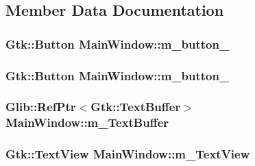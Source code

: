 \subsection{Member Data Documentation}
\subsubsection[{\texorpdfstring{m\+\_\+button\+\_\+1}{m_button_1}}]{\setlength{\rightskip}{0pt plus 5cm}Gtk\+::\+Button Main\+Window\+::m\+\_\+button\+\_\hspace{0.3cm}{\ttfamily [private]}}\hypertarget{class_main_window_a3fb958b7cfc0c5c8570cd0549540959b}{}\label{class_main_window_a3fb958b7cfc0c5c8570cd0549540959b}
\subsubsection[{\texorpdfstring{m\+\_\+button\+\_\+2}{m_button_2}}]{\setlength{\rightskip}{0pt plus 5cm}Gtk\+::\+Button Main\+Window\+::m\+\_\+button\+\_\hspace{0.3cm}{\ttfamily [private]}}\hypertarget{class_main_window_a903e80cb1e32d50fb1c99ee713a79c41}{}\label{class_main_window_a903e80cb1e32d50fb1c99ee713a79c41}
\subsubsection[{\texorpdfstring{m\+\_\+\+Text\+Buffer}{m_TextBuffer}}]{\setlength{\rightskip}{0pt plus 5cm}Glib\+::\+Ref\+Ptr$<$Gtk\+::\+Text\+Buffer$>$ Main\+Window\+::m\+\_\+\+Text\+Buffer\hspace{0.3cm}{\ttfamily [private]}}\hypertarget{class_main_window_aed3aaf252ef7089a980ac7a906dadc9c}{}\label{class_main_window_aed3aaf252ef7089a980ac7a906dadc9c}
\subsubsection[{\texorpdfstring{m\+\_\+\+Text\+View}{m_TextView}}]{\setlength{\rightskip}{0pt plus 5cm}Gtk\+::\+Text\+View Main\+Window\+::m\+\_\+\+Text\+View\hspace{0.3cm}{\ttfamily [private]}}\hypertarget{class_main_window_ad0e686fded3dc2b398152a81797e6f9c}{}\label{class_main_window_ad0e686fded3dc2b398152a81797e6f9c}
